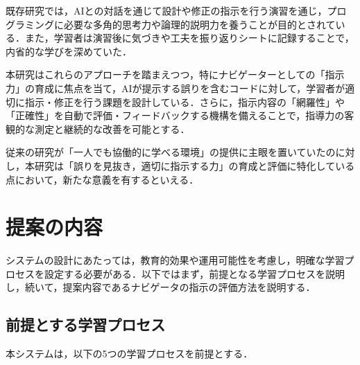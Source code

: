 \documentclass[twoside,twocolumn,10pt]{jsarticle}
\begin{document}
既存研究では，AIとの対話を通じて設計や修正の指示を行う演習を通じ，プログラミングに必要な多角的思考力や論理的説明力を養うことが目的とされている．また，学習者は演習後に気づきや工夫を振り返りシートに記録することで，内省的な学びを深めていた\cite{原田紗希2024生成}．

本研究はこれらのアプローチを踏まえつつ，特にナビゲーターとしての「指示力」の育成に焦点を当て，AIが提示する誤りを含むコードに対して，学習者が適切に指示・修正を行う課題を設計している．さらに，指示内容の「網羅性」や「正確性」を自動で評価・フィードバックする機構を備えることで，指導力の客観的な測定と継続的な改善を可能とする．

従来の研究が「一人でも協働的に学べる環境」の提供に主眼を置いていたのに対し，本研究は「誤りを見抜き，適切に指示する力」の育成と評価に特化している点において，新たな意義を有するといえる．

\section{提案の内容}\label{sec:提案の内容}
システムの設計にあたっては，教育的効果や運用可能性を考慮し，明確な学習プロセスを設定する必要がある．以下ではまず，前提となる学習プロセスを説明し，続いて，提案内容であるナビゲータの指示の評価方法を説明する．

\subsection{前提とする学習プロセス}
本システムは，以下の5つの学習プロセスを前提とする．
\end{document}
